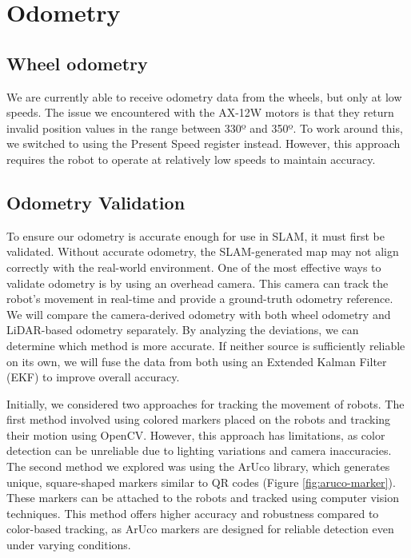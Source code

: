 \chapter{Odometry}

\section*{Wheel odometry}
We are currently able to receive odometry data from the wheels, but only at low speeds. The issue we encountered with the AX-12W motors is that they return invalid position values in the range between 330º and 350º. To work around this, we switched to using the Present Speed register instead. However, this approach requires the robot to operate at relatively low speeds to maintain accuracy.

\section*{Odometry Validation}
To ensure our odometry is accurate enough for use in SLAM, it must first be validated. Without accurate odometry, the SLAM-generated map may not align correctly with the real-world environment. One of the most effective ways to validate odometry is by using an overhead camera. This camera can track the robot’s movement in real-time and provide a ground-truth odometry reference. We will compare the camera-derived odometry with both wheel odometry and LiDAR-based odometry separately. By analyzing the deviations, we can determine which method is more accurate. If neither source is sufficiently reliable on its own, we will fuse the data from both using an Extended Kalman Filter (EKF) to improve overall accuracy.
\newline

Initially, we considered two approaches for tracking the movement of robots. The first method involved using colored markers placed on the robots and tracking their motion using OpenCV. However, this approach has limitations, as color detection can be unreliable due to lighting variations and camera inaccuracies. The second method we explored was using the ArUco library, which generates unique, square-shaped markers similar to QR codes (Figure \ref{fig:aruco-marker}). These markers can be attached to the robots and tracked using computer vision techniques. This method offers higher accuracy and robustness compared to color-based tracking, as ArUco markers are designed for reliable detection even under varying conditions.

